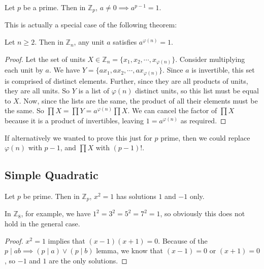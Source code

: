 \begin{theorem}
	Let $p$ be a prime. Then in $\mathbb Z_p$, $a \neq 0 \implies a^{p-1} = 1$.
\end{theorem}
\noindent This is actually a special case of the following theorem:
\begin{theorem}
	Let $n \geq 2$. Then in $\mathbb Z_n$, any unit $a$ satisfies $a^{\varphi(n)} = 1$.
\end{theorem}
\begin{proof}
	Let the set of units $X \in \mathbb Z_n = \{ x_1, x_2, \cdots, x_{\varphi(n)} \}$. Consider multiplying each unit by $a$. We have $Y = \{ ax_1, ax_2, \cdots, ax_{\varphi(n)} \}$. Since $a$ is invertible, this set is comprised of distinct elements. Further, since they are all products of units, they are all units. So $Y$ is a list of $\varphi(n)$ distinct units, so this list must be equal to $X$. Now, since the lists are the same, the product of all their elements must be the same. So $\prod X = \prod Y = a^{\varphi(n)}\prod X$. We can cancel the factor of $\prod X$ because it is a product of invertibles, leaving $1 = a^{\varphi(n)}$ as required.
\end{proof}
If alternatively we wanted to prove this just for $p$ prime, then we could replace $\varphi(n)$ with $p-1$, and $\prod X$ with $(p-1)!$.

\subsection{Simple Quadratic}
\begin{lemma}
	Let $p$ be prime. Then in $\mathbb Z_p$, $x^2 = 1$ has solutions $1$ and $-1$ only.
\end{lemma}
\begin{note}
	In $\mathbb Z_8$, for example, we have $1^2 = 3^2 = 5^2 = 7^2 = 1$, so obviously this does not hold in the general case.
\end{note}
\begin{proof}
	$x^2 = 1$ implies that $(x-1)(x+1) = 0$. Because of the $p\mid ab\implies (p\mid a) \lor (p\mid b)$ lemma, we know that $(x-1) = 0$ or $(x+1) = 0$, so $-1$ and $1$ are the only solutions.
\end{proof}
